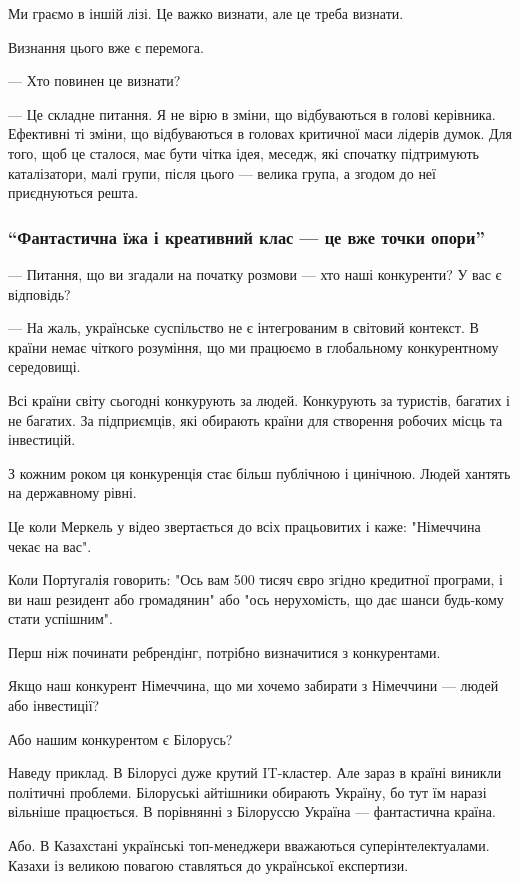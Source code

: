 Ми граємо в іншій лізі. Це важко визнати, але це треба визнати.

Визнання цього вже є перемога.

--- Хто повинен це визнати?

--- Це складне питання. Я не вірю в зміни, що відбуваються в голові керівника.
Ефективні ті зміни, що відбуваються в головах критичної маси лідерів думок. Для
того, щоб це сталося, має бути чітка ідея, меседж, які спочатку підтримують
каталізатори, малі групи, після цього --- велика група, а згодом до неї
приєднуються решта. 

\subsubsection{\enquote{Фантастична їжа і креативний клас --- це вже точки опори}}

--- Питання, що ви згадали на початку розмови --- хто наші конкуренти? У вас є
відповідь?

--- На жаль, українське суспільство не є інтегрованим в світовий контекст. В
країни немає чіткого розуміння, що ми працюємо в глобальному конкурентному
середовищі.

Всі країни світу сьогодні конкурують за людей. Конкурують за туристів, багатих
і не багатих. За підприємців, які обирають країни для створення робочих місць
та інвестицій.

З кожним роком ця конкуренція стає більш публічною і цинічною. Людей хантять на державному рівні.

Це коли Меркель у відео звертається до всіх працьовитих і каже: "Німеччина
чекає на вас". 

Коли Португалія говорить: "Ось вам 500 тисяч євро згідно кредитної програми, і
ви наш резидент або громадянин" або "ось нерухомість, що дає шанси будь-кому
стати успішним".

Перш ніж починати ребрендінг, потрібно визначитися з конкурентами.

Якщо наш конкурент Німеччина, що ми хочемо забирати з Німеччини --- людей або інвестиції?

Або нашим конкурентом є Білорусь?

Наведу приклад. В Білорусі дуже крутий IT-кластер. Але зараз в країні виникли
політичні проблеми. Білоруські айтішники обирають Україну, бо тут їм наразі
вільніше працюється. В порівнянні з Білоруссю Україна --- фантастична країна.

Або. В Казахстані українські топ-менеджери вважаються суперінтелектуалами.
Казахи із великою повагою ставляться до української експертизи.

